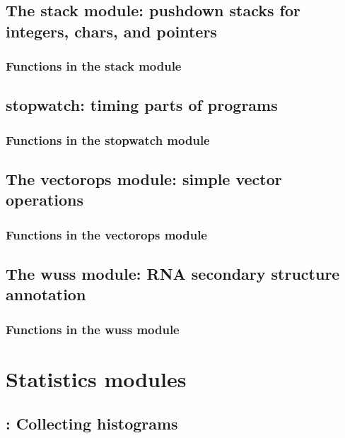 \documentclass[11pt]{book}
\begin{document}
\newpage
\section{The stack module: pushdown stacks for integers, chars, and pointers}

\subsection{Functions in the stack module}


\newpage
\section{stopwatch: timing parts of programs}

\subsection{Functions in the stopwatch module}


\newpage
\section{The vectorops module: simple vector operations}

\subsection{Functions in the vectorops module}


\newpage
\section{The wuss module: RNA secondary structure annotation}

\subsection{Functions in the wuss module}



\newpage
\chapter{Statistics modules}


\newpage
\section{: Collecting histograms}

\end{document}
